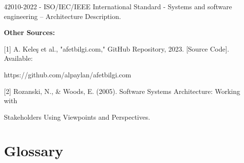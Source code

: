 \documentclass[12pt, letterpaper]{article}
\begin{document}
42010-2022 - ISO/IEC/IEEE International Standard - Systems and software engineering – Architecture Description.

\vspace{0.5cm}
\textbf{Other Sources:}
\vspace{0.2cm}

[1] A. Keleş et al., "afetbilgi.com," GitHub Repository, 2023. [Source Code]. Available: 

https://github.com/alpaylan/afetbilgi.com

[2] Rozanski, N., \& Woods, E. (2005). Software Systems Architecture: Working with

Stakeholders Using Viewpoints and Perspectives.

\newpage

\section{Glossary}
\end{document}
